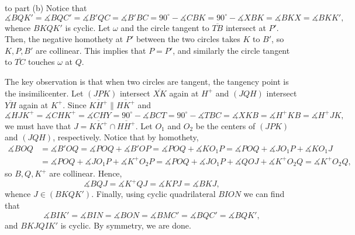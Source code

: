 \begin{customsol}{to part (b)}
    Notice that \[\measuredangle BQK'=\measuredangle BQC'=\measuredangle B'QC=\measuredangle B'BC=90^\circ-\measuredangle CBK=90^\circ-\measuredangle XBK=\measuredangle BKX=\measuredangle BKK',\]
    whence $BKQK'$ is cyclic. Let $\omega$ and the circle tangent to $\overline{TB}$ intersect at $P'$. Then, the negative homothety at $P'$ between the two circles takes $K$ to $B'$, so $K,P,B'$ are collinear. This implies that $P=P'$, and similarly the circle tangent to $\overline{TC}$ touches $\omega$ at $Q$.

    The key observation is that when two circles are tangent, the tangency point is the insimilicenter. Let $(JPK)$ intersect $\overline{XK}$ again at $H^+$ and $(JQH)$ intersect $\overline{YH}$ again at $K^+$. Since $\overline{KH^+}\parallel\overline{HK^+}$ and \[\measuredangle HJK^+=\measuredangle CHK^+=\measuredangle CHY=90^\circ-\measuredangle BCT=90^\circ-\measuredangle TBC=\measuredangle XKB=\measuredangle H^+KB=\measuredangle H^+JK,\]
    we must have that $J=\overline{KK^+}\cap\overline{HH^+}$. Let $O_1$ and $O_2$ be the centers of $(JPK)$ and $(JQH)$, respectively. Notice that by homothety,
    \begin{align*}
        \measuredangle BOQ&=\measuredangle B'OQ=\measuredangle POQ+\measuredangle B'OP=\measuredangle POQ+\measuredangle KO_1P=\measuredangle POQ+\measuredangle JO_1P+\measuredangle KO_1J\\
        &=\measuredangle POQ+\measuredangle JO_1P+\measuredangle K^+O_2P=\measuredangle POQ+\measuredangle JO_1P+\measuredangle QOJ+\measuredangle K^+O_2Q=\measuredangle K^+O_2Q,
    \end{align*}
    so $B,Q,K^+$ are collinear. Hence, \[\measuredangle BQJ=\measuredangle K^+QJ=\measuredangle KPJ=\measuredangle BKJ,\]
    whence $J\in(BKQK')$. Finally, using cyclic quadrilateral $BION$ we can find that \[\measuredangle BIK'=\measuredangle BIN=\measuredangle BON=\measuredangle BMC'=\measuredangle BQC'=\measuredangle BQK',\]
    and $BKJQIK'$ is cyclic. By symmetry, we are done.
\end{customsol}

